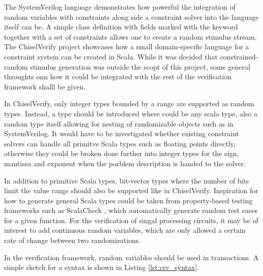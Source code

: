 The SystemVerilog language demonstrates how powerful the integration of random variables with constraints along side
a constraint solver into the language itself can be. A simple class definition with fields marked with the 
keyword together with a set of constraints allows one to create a random stimulus stream. The ChiselVerify project showcases how a small domain-specific language for a
constraint system can be created in Scala. While it was decided that constrained-random stimulus generation was outside the scopt of this project, some general throughts onn how it could be integrated with the rest of the verification framework shalll be given. 

In ChiselVerify, only integer types bounded by a range are supported as random types. Instead, a  type
should be introduced where  could be any scala type, also a random type itself allowing for nesting of
randomizable objects such as in SystemVerilog. It would have to be investigated whether existing constraint solvers
can handle all primitve Scala types such as floating points directly, otherwise they could be broken done further
into integer types for the sign, mantissa and exponent when the porblem description is handed to the solver.

In addition to primitive Scala types, bit-vector types where the number of bits limit the value range should also be
supported like in ChiselVerify. Inspiration for how to generate general Scala types could be taken from
property-based testing frameworks such as ScalaCheck \cite{scalacheck}, which automatically generate random test
cases for a given function. For the verification of singal processing circuits, it may be of interest to add
continuous random variables, which are only allowed a certain rate of change between two randomizations.

In the verification framework, random variables should be used in transactions. A simple sketch for a syntax is shown
in Listing \ref{lst:crv_syntax}.

